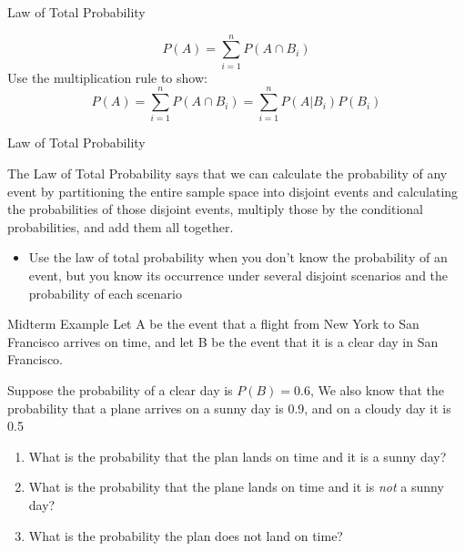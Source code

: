 \documentclass{beamer}
\begin{document}
\begin{frame}{Law of Total Probability}
	
	$$P(A)=\sum_{i=1}^nP(A \cap B_i)$$
	Use the multiplication rule to show:
	$$P(A)=\sum_{i=1}^n P(A \cap B_i) = \sum_{i=1}^n P(A|B_i)P(B_i)$$
	
\end{frame}

\begin{frame}{Law of Total Probability}
	
	The \alert{Law of Total Probability} says that we can calculate the probability of any event by partitioning the entire sample space into disjoint events and calculating the probabilities of those disjoint events, multiply those by the conditional probabilities, and add them all together.
	\begin{itemize}
		\item Use the law of total probability when you don't know the probability of an event, but you know its occurrence under several disjoint scenarios and the probability of each scenario
	\end{itemize}
	
\end{frame}

\begin{frame}{Midterm Example}
	Let A be the event that a flight from New York to San Francisco arrives on time, and let B be the event that it is a clear day in San Francisco.
	
	Suppose the probability of a clear day is $P(B)=0.6$, We also know that the probability that a plane arrives on a sunny day is 0.9, and on a cloudy day it is 0.5
	
	\begin{enumerate}[label=(\alph*)]
		\item What is the probability that the plan lands on time and it is a sunny day?
		\item What is the probability that the plane lands on time and it is \textit{not} a sunny day?
		\item What is the probability the plan does not land on time?
	\end{enumerate}
\end{frame}
\end{document}
